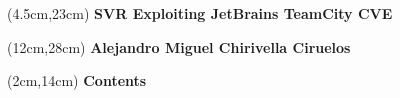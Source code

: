 
\begin{textblock*}{15cm}(4.5cm,23cm)
    \huge{\textcolor{letras_blancas}{\textbf{SVR Exploiting JetBrains TeamCity CVE}}}
\end{textblock*}
\begin{textblock*}{15cm}(12cm,28cm)
    \large{\textcolor{letras_blancas}{\textbf{Alejandro Miguel Chirivella Ciruelos}}}
\end{textblock*}
\mbox{}

\newpage

\mbox{}
\begin{textblock*}{15cm}(2cm,14cm)
    \huge{\textcolor{letras_blancas}{\textbf{Contents}}}
\end{textblock*}

\newpage

\tableofcontents

\clearpage
